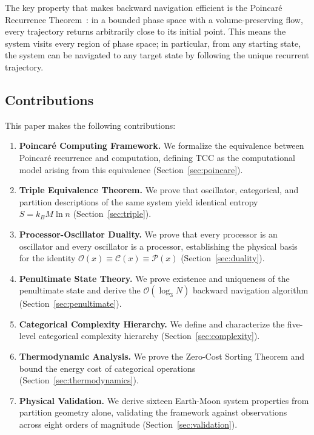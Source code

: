 \documentclass[12pt,twocolumn]{article}
\begin{document}
The key property that makes backward navigation efficient is the Poincaré Recurrence Theorem~\cite{poincare1890probleme}: in a bounded phase space with a volume-preserving flow, every trajectory returns arbitrarily close to its initial point. This means the system visits every region of phase space; in particular, from any starting state, the system can be navigated to any target state by following the unique recurrent trajectory.

\subsection{Contributions}

This paper makes the following contributions:

\begin{enumerate}[leftmargin=*]
\item \textbf{Poincaré Computing Framework.} We formalize the equivalence between Poincaré recurrence and computation, defining TCC as the computational model arising from this equivalence (Section~\ref{sec:poincare}).

\item \textbf{Triple Equivalence Theorem.} We prove that oscillator, categorical, and partition descriptions of the same system yield identical entropy $S = k_B M \ln n$ (Section~\ref{sec:triple}).

\item \textbf{Processor-Oscillator Duality.} We prove that every processor is an oscillator and every oscillator is a processor, establishing the physical basis for the identity $\mathcal{O}(x) \equiv \mathcal{C}(x) \equiv \mathcal{P}(x)$ (Section~\ref{sec:duality}).

\item \textbf{Penultimate State Theory.} We prove existence and uniqueness of the penultimate state and derive the $\mathcal{O}(\log_3 N)$ backward navigation algorithm (Section~\ref{sec:penultimate}).

\item \textbf{Categorical Complexity Hierarchy.} We define and characterize the five-level categorical complexity hierarchy (Section~\ref{sec:complexity}).

\item \textbf{Thermodynamic Analysis.} We prove the Zero-Cost Sorting Theorem and bound the energy cost of categorical operations (Section~\ref{sec:thermodynamics}).

\item \textbf{Physical Validation.} We derive sixteen Earth-Moon system properties from partition geometry alone, validating the framework against observations across eight orders of magnitude (Section~\ref{sec:validation}).
\end{enumerate}
\end{document}
